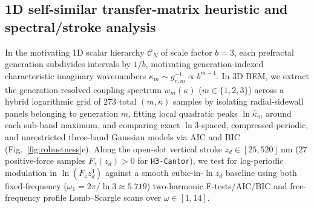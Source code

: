 \documentclass[pdflatex,sn-nature]{sn-jnl}
\begin{document}
\subsection*{1D self-similar transfer-matrix heuristic and spectral/stroke analysis}
In the motivating 1D scalar hierarchy $\mathcal{C}_N$ of scale factor $b=3$\cite{milton2004,gordon2026prd}, each prefractal generation subdivides intervals by $1/b$, motivating generation-indexed characteristic imaginary wavenumbers $\kappa_m \sim g_{r,m}^{-1} \propto b^{m-1}$. In 3D BEM, we extract the generation-resolved coupling spectrum $w_m(\kappa)$ ($m \in \{1,2,3\}$) across a hybrid logarithmic grid of $273$ total $(m,\kappa)$ samples by isolating radial-sidewall panels belonging to generation $m$, fitting local quadratic peaks $\ln\hat{\kappa}_m$ around each sub-band maximum, and comparing exact $\ln 3$-spaced, compressed-periodic, and unrestricted three-band Gaussian models via AIC and BIC (Fig.~\ref{fig:robustness}e). Along the open-slot vertical stroke $z_d \in [25, 520]\ \mathrm{nm}$ ($27$ positive-force samples $F_z(z_d)>0$ for \texttt{H3-Cantor}), we test for log-periodic modulation in $\ln(F_z z_d^4)$ against a smooth cubic-in-$\ln z_d$ baseline using both fixed-frequency ($\omega_1 = 2\pi/\ln 3 \approx 5.719$) two-harmonic F-tests/AIC/BIC and free-frequency profile Lomb--Scargle\cite{scargle1982} scans over $\omega \in [1,14]$.
\end{document}
